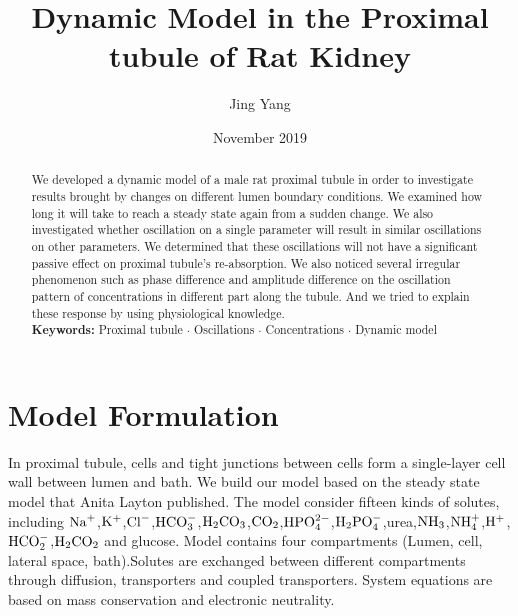 \documentclass{article}
\title{Dynamic Model in the Proximal tubule of Rat Kidney}
\author{Jing Yang}
\date{November 2019}
\begin{document}
\maketitle

\begin{abstract}
We developed a dynamic model of a male rat proximal tubule in order to investigate results brought by changes on different lumen boundary conditions. We examined how long it will take to reach a steady state again from a sudden change. We also investigated whether oscillation on a single parameter will result in similar oscillations on other parameters. We determined that these oscillations will not have a significant passive effect on proximal tubule's re-absorption. We also noticed several irregular phenomenon such as phase difference and amplitude difference on the oscillation pattern of concentrations in different part along the tubule. And we tried to explain these response by using physiological knowledge.\\

\noindent \textbf{Keywords: }Proximal tubule $\cdot$ Oscillations $\cdot$ Concentrations $\cdot$ Dynamic model
\end{abstract}


\section{Model Formulation}
In proximal tubule, cells and tight junctions between cells form a single-layer cell wall between lumen and bath. We build our model based on the steady state model that Anita Layton published. The model consider fifteen kinds of solutes, including $\rm {Na}^{+}$,$\rm {K}^{+}$,$\rm {Cl}^{-}$,$\rm {HCO}_{3}^{-}$,$\rm H_{2}CO_{3}$,$\rm CO_{2}$,$\rm HPO_{4}^{2-}$,$\rm H_{2}PO_{4}^{-}$,urea,$\rm NH_{3}$,$\rm NH_{4}^{+}$,$\rm H^{+}$,\\$\rm HCO_{2}^{-}$,$\rm H_{2}CO_2$ and glucose. Model contains four compartments (Lumen, cell, lateral space, bath).Solutes are exchanged between different compartments through diffusion, transporters and coupled transporters. System equations are based on mass conservation and electronic neutrality. 
\end{document}

